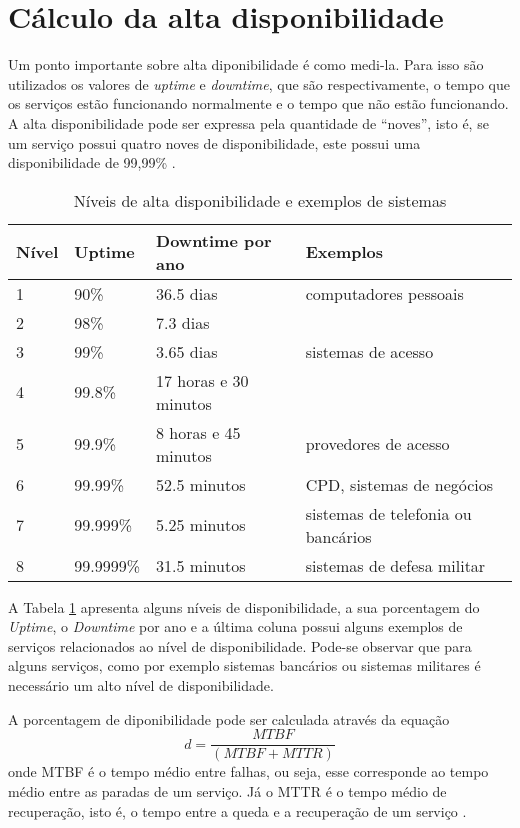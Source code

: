 \section{Cálculo da alta disponibilidade}

Um ponto importante sobre alta diponibilidade é como medi-la. Para isso são utilizados os valores de \textit{uptime} e \textit{downtime}, 
que são respectivamente, o tempo que os serviços estão funcionando normalmente e o tempo que não estão funcionando. A alta disponibilidade 
pode ser expressa pela quantidade de ``noves'', isto é, se um serviço possui quatro noves de disponibilidade, este possui uma 
disponibilidade de 99,99\% \cite{pereirafilho2004}.

\begin{table}
\caption {Níveis de alta disponibilidade e exemplos de sistemas}
\label{tab:dispniveis}
\begin{center}
\begin{tabular}{|l|l|l|l|}\hline
Nível & Uptime & Downtime por ano & Exemplos\\\hline
1 & 90\% & 36.5 dias & computadores pessoais\\\hline
2 & 98\% & 7.3 dias & \\\hline
3 & 99\% & 3.65 dias & sistemas de acesso\\\hline
4 & 99.8\% & 17 horas e 30 minutos & \\\hline
5 & 99.9\% & 8 horas e 45 minutos & provedores de acesso\\\hline
6 & 99.99\% & 52.5 minutos & CPD, sistemas de negócios\\\hline
7 & 99.999\% & 5.25 minutos & sistemas de telefonia ou bancários\\\hline
8 & 99.9999\% & 31.5 minutos & sistemas de defesa militar\\\hline
\end{tabular}
\end{center}
\end{table}

A Tabela \ref{tab:dispniveis} apresenta alguns níveis de disponibilidade, a sua porcentagem do \textit{Uptime}, o \textit{Downtime} por ano 
e a última coluna possui alguns exemplos de serviços relacionados ao nível de disponibilidade. Pode-se observar que para alguns serviços, 
como por exemplo sistemas bancários ou sistemas militares é necessário um alto nível de disponibilidade.

A porcentagem de diponibilidade pode ser calculada através da equação
\begin{equation}
d = \frac{MTBF}{(MTBF + MTTR)}
\label{diponibilidade}
\end{equation}
onde \ac{MTBF} é o tempo médio entre falhas, ou seja, esse corresponde ao tempo médio entre as paradas de um serviço. Já o \ac{MTTR} é o 
tempo médio de recuperação, isto é, o tempo entre a queda e a recuperação de um serviço \cite{goncalves2009}.

